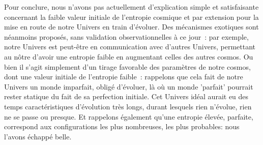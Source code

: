 Pour conclure, nous n'avons pas actuellement d'explication simple et satisfaisante concernant la faible valeur initiale de l'entropie cosmique et par extension pour la mise en route de notre Univers en train d'évoluer. Des mécanismes exotiques sont néanmoins proposés, sans validation observationnelles à ce jour~: par exemple, notre Univers est peut-être en communication avec d'autres Univers, permettant au nôtre d'avoir une entropie faible en augmentant celles des autres cosmos. Ou bien il s'agit simplement d'un tirage favorable des paramètres de notre cosmos, dont une valeur initiale de l'entropie faible~: rappelons que cela fait de notre Univers un monde imparfait, obligé d'évoluer, là où un monde 'parfait' pourrait rester statique du fait de sa perfection initiale.  Cet Univers idéal aurait eu des temps caractéristiques d'évolution très longs, durant lesquels rien n'évolue, rien ne se passe ou presque. Et rappelons également qu'une entropie élevée, parfaite, correspond aux configurations les plus nombreuses, les plus probables: nous l'avons échappé belle.